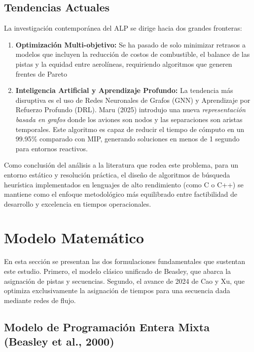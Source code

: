 \documentclass[letter, 10pt]{article}
\begin{document}
\subsection{Tendencias Actuales}
La investigaci\'on contempor\'anea del ALP se dirige hacia dos grandes fronteras:
\begin{enumerate}
    \item \textbf{Optimizaci\'on Multi-objetivo:} Se ha pasado de solo minimizar retrasos a modelos que incluyen la reducci\'on de costos de combustible, el balance de las pistas y la equidad entre aerol\'ineas, requiriendo algoritmos que generen frentes de Pareto \cite{zhang2020}
    \item \textbf{Inteligencia Artificial y Aprendizaje Profundo:} La tendencia m\'as disruptiva es el uso de Redes Neuronales de Grafos (GNN) y Aprendizaje por Refuerzo Profundo (DRL). Maru (2025)\cite{maru2025} introdujo una nueva \textit{representaci\'on basada en grafos} donde los aviones son nodos y las separaciones son aristas temporales. Este algoritmo es capaz de reducir el tiempo de c\'omputo en un 99.95\% comparado con MIP, generando soluciones en menos de 1 segundo para entornos reactivos.
\end{enumerate}

Como conclusi\'on del an\'alisis a la literatura que rodea este problema, para un entorno est\'atico y resoluci\'on pr\'actica, el dise\~no de 
algoritmos de b\'usqueda heur\'istica implementados en lenguajes de alto rendimiento (como C o C++) se mantiene 
como el enfoque metodol\'ogico m\'as equilibrado entre factibilidad de desarrollo y excelencia en 
tiempos operacionales.

\section{Modelo Matem\'atico}

En esta secci\'on se presentan las dos formulaciones fundamentales que sustentan este estudio. Primero, el modelo cl\'asico unificado de Beasley, que abarca la asignaci\'on de pistas y secuencias. Segundo, el avance de 2024 de Cao y Xu, que optimiza exclusivamente la asignaci\'on de tiempos para una secuencia dada mediante redes de flujo.

\subsection{Modelo de Programaci\'on Entera Mixta (Beasley et al., 2000)\cite{beasley2000}}
\end{document}

